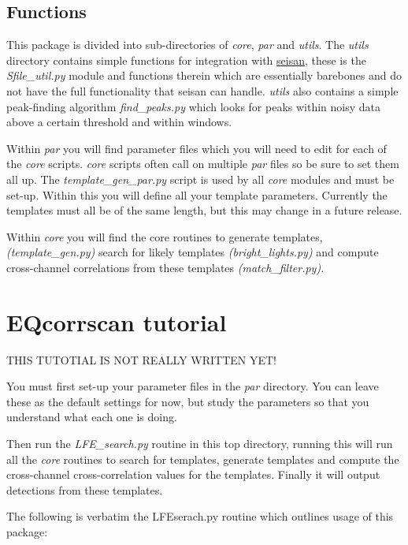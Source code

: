 \documentclass[a4paper,10pt,english]{sphinxmanual}
\begin{document}
\section{Functions}
\label{intro:functions}
This package is divided into sub-directories of \emph{core}, \emph{par} and \emph{utils}.  The
\emph{utils} directory contains simple functions for integration with
\href{http://seisan.info/}{seisan}, these is the \emph{Sfile\_util.py}
module and functions therein which are essentially barebones and do not have the
full functionality that seisan can handle.  \emph{utils} also contains a simple
peak-finding algorithm \emph{find\_peaks.py} which looks for peaks within noisy data
above a certain threshold and within windows.

Within \emph{par} you will find parameter files which you will need to edit for
each of the \emph{core} scripts.  \emph{core} scripts often call on multiple \emph{par} files
so be sure to set them all up.  The \emph{template\_gen\_par.py} script is used by all
\emph{core} modules and must be set-up.  Within this you will define all your
template parameters.  Currently the templates must all be of the same length,
but this may change in a future release.

Within \emph{core} you will find the core routines to generate templates,
\emph{(template\_gen.py)} search for likely templates \emph{(bright\_lights.py)} and
compute cross-channel correlations from these templates \emph{(match\_filter.py)}.


\chapter{EQcorrscan tutorial}
\label{tutorial:eqcorrscan-tutorial}\label{tutorial::doc}
THIS TUTOTIAL IS NOT REALLY WRITTEN YET!

You must first set-up your parameter files in the \emph{par} directory.  You can
leave these as the default settings for now, but study the parameters so that
you understand what each one is doing.

Then run the \emph{LFE\_search.py} routine in this top directory, running this will
run all the \emph{core} routines to search for templates, generate templates and
compute the cross-channel cross-correlation values for the templates.  Finally
it will output detections from these templates.

The following is verbatim the LFEserach.py routine which outlines usage of this
package:
\end{document}
